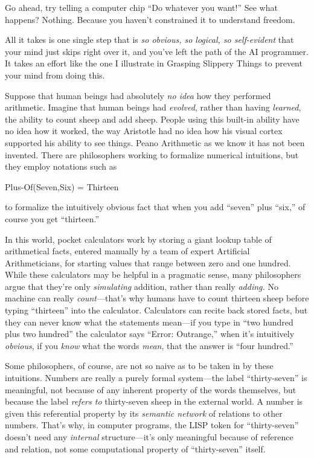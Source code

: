 {
 Go ahead, try telling a computer chip ``Do
whatever you want!'' See what happens? Nothing.
Because you haven't constrained it to understand
freedom.}

{
 All it takes is one single step that is \textit{so obvious, so
logical, so self-evident} that your mind just skips right over it, and
you've left the path of the AI programmer. It takes an
effort like the one I illustrate in Grasping Slippery Things to prevent
your mind from doing this.}

\myendsectiontext


{
 Suppose that human beings had absolutely \textit{no idea} how they
performed arithmetic. Imagine that human beings had \textit{evolved},
rather than having \textit{learned}, the ability to count sheep and add
sheep. People using this built-in ability have no idea how it worked,
the way Aristotle had no idea how his visual cortex supported his
ability to see things. Peano Arithmetic as we know it has not been
invented. There are philosophers working to formalize numerical
intuitions, but they employ notations such as}

{\centering
 Plus-Of(Seven,Six) = Thirteen
\par}


\bigskip

{
 to formalize the intuitively obvious fact that when you add
``seven'' plus
``six,'' of course you get
``thirteen.'' }

{
 In this world, pocket calculators work by storing a giant lookup
table of arithmetical facts, entered manually by a team of expert
Artificial Arithmeticians, for starting values that range between zero
and one hundred. While these calculators may be helpful in a pragmatic
sense, many philosophers argue that they're only
\textit{simulating} addition, rather than really \textit{adding.} No
machine can really \textit{count}{}---that's why humans
have to count thirteen sheep before typing
``thirteen'' into the calculator.
Calculators can recite back stored facts, but they can never know what
the statements mean---if you type in ``two hundred
plus two hundred'' the calculator says
``Error: Outrange,'' when
it's intuitively \textit{obvious}, if you \textit{know}
what the words \textit{mean}, that the answer is
``four hundred.''}

{
 Some philosophers, of course, are not so naive as to be taken in
by these intuitions. Numbers are really a purely formal system---the
label ``thirty-seven'' is
meaningful, not because of any inherent property of the words
themselves, but because the label \textit{refers to} thirty-seven sheep
in the external world. A number is given this referential property by
its \textit{semantic network} of relations to other numbers.
That's why, in computer programs, the LISP token for
``thirty-seven''
doesn't need any \textit{internal}
structure---it's only meaningful because of reference
and relation, not some computational property of
``thirty-seven'' itself.}

